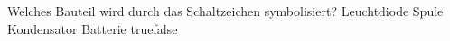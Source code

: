     {Welches Bauteil wird durch das Schaltzeichen symbolisiert?}
    {Leuchtdiode}
    {Spule}
    {Kondensator}
    {Batterie}
    {true}{false}